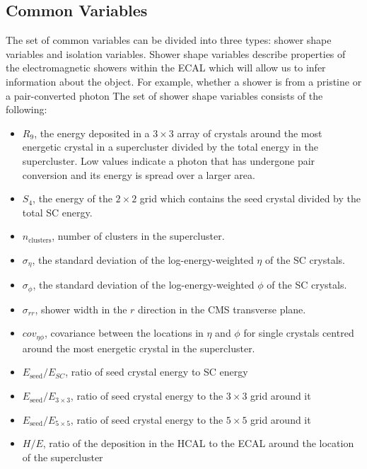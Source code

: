 \subsection{Common Variables}
The set of common variables can be divided into three types: shower shape variables and isolation variables. 
Shower shape variables describe properties of the electromagnetic showers within the ECAL which will allow us to infer information about the object. For example, whether a shower is from a pristine or a pair-converted photon
The set of shower shape variables consists of the following:
\begin{itemize}[leftmargin=.5in,noitemsep]
    \item $R_{9}$, the energy deposited in a $3\times{}3$ array of crystals around the most energetic crystal in a supercluster divided by the total energy in the supercluster. Low values indicate a photon that has undergone pair conversion and its energy is spread over a larger area. 
    \item $S_4$, the energy of the $2\times{}2$ grid which contains the seed crystal divided by the total SC energy.
    \item $n_{\mathrm{clusters}}$, number of clusters in the supercluster.
    \item $\sigma_{\eta}$, the standard deviation of the log-energy-weighted $\eta$ of the SC crystals.
    \item $\sigma_{\phi}$, the standard deviation of the log-energy-weighted $\phi$ of the SC crystals.
    \item $\sigma_{rr}$, shower width in the $r$ direction in the CMS transverse plane.
    \item $cov_{\eta\phi}$, covariance between the locations in $\eta$ and $\phi$ for single crystals centred around the most energetic crystal in the supercluster.
    \item $E_{\mathrm{seed}}/E_{SC}$, ratio of seed crystal energy to SC energy
    \item $E_{\mathrm{seed}}/E_{3\times{}3}$, ratio of seed crystal energy to the $3\times{}3$ grid around it
    \item $E_{\mathrm{seed}}/E_{5\times{}5}$, ratio of seed crystal energy to the $5\times{}5$ grid around it
    \item $H/E$, ratio of the deposition in the HCAL to the ECAL around the location of the supercluster
\end{itemize}


